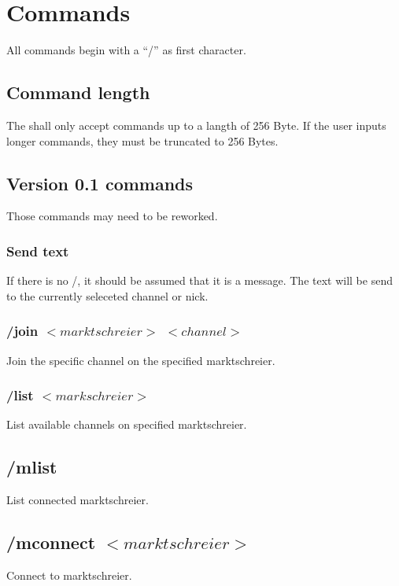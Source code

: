 \documentclass[12pt,a4paper]{article}
\begin{document}
\section{Commands}
All commands begin with a "`/"' as first character.

\subsection{Command length}
The shall only accept commands up to a langth of 256 Byte.
If the user inputs longer commands, they must be truncated
to 256 Bytes.
\subsection{Version 0.1 commands}
Those commands may need to be reworked.
\subsubsection{Send text}
If there is no /, it should be assumed that it is a message.
The text will be send to the currently seleceted channel or nick.

\subsubsection{/join $<marktschreier>$ $<channel>$}
Join the specific channel on the specified marktschreier.

\subsubsection{/list $<markschreier>$}
List available channels on specified marktschreier.

\subsection{/mlist}
List connected marktschreier.

\subsection{/mconnect $<marktschreier>$}
Connect to marktschreier.
\end{document}
